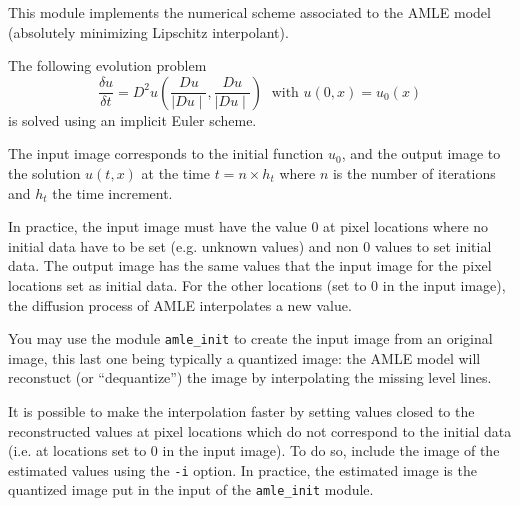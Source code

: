 This module implements the numerical scheme associated to the
AMLE model (absolutely minimizing Lipschitz interpolant).

The following evolution problem
\[
\frac{\delta u}{\delta t} = D^2 u \left( \frac{Du}{\mid Du \mid }, \frac{Du}{\mid Du \mid } \right) \; \mbox{ with } u(0,x)=u_0(x)
\]
is solved using an implicit Euler scheme.

The input image corresponds to the initial function $u_0$, and the output
image to the solution $u(t,x)$ at the time $t = n \times h_t$ where
$n$ is the number of iterations and $h_t$ the time increment.

In practice, the input image must have the value $0$ at pixel locations where
no initial data have to be set (e.g. unknown values) and non $0$ values
to set initial data. 
The output image has the same values that the input image for the
pixel locations set as initial data. For the other locations (set to $0$ in
the input image), the diffusion process of AMLE interpolates a new value.

You may use the module \verb+amle_init+ to create the input image
from an original image, this last one being typically a quantized image:
the AMLE model will reconstuct (or ``dequantize'') the image by
interpolating the missing level lines.

It is possible to make the interpolation faster by setting values closed
to the reconstructed values at pixel locations which do not correspond
to the initial data (i.e. at locations set to $0$ in the input image).
To do so, include the image of the estimated values using the \verb+-i+
option.
In practice, the estimated image is the quantized image put in the input
of the \verb+amle_init+ module.


